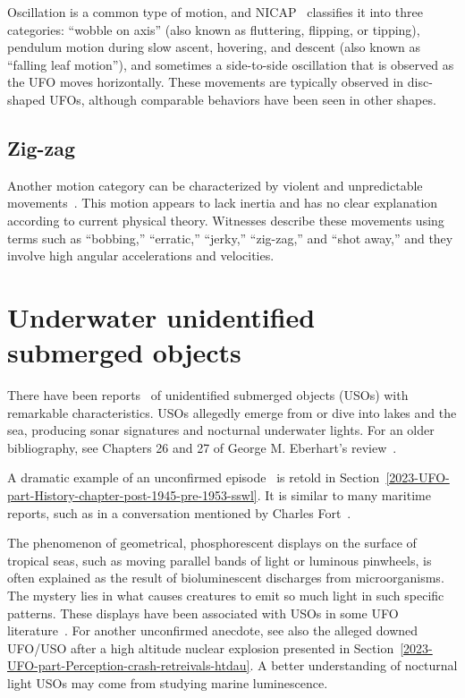 Oscillation is a common type of motion, and NICAP~\cite[p.~26]{Kocher-RAND-1968Jan} classifies it into three categories: ``wobble on axis'' (also known as fluttering, flipping, or tipping), pendulum motion during slow ascent, hovering, and descent (also known as ``falling leaf motion''), and sometimes a side-to-side oscillation that is observed as the UFO moves horizontally. These movements are typically observed in disc-shaped UFOs, although comparable behaviors have been seen in other shapes.

\subsection{Zig-zag}

Another motion category can be characterized by violent and unpredictable movements~\cite[p.~26]{Kocher-RAND-1968Jan}. This motion appears to lack inertia and has no clear explanation according to current physical theory. Witnesses describe these movements using terms such as ``bobbing,'' ``erratic,'' ``jerky,'' ``zig-zag,'' and ``shot away,'' and they involve high angular accelerations and velocities.

\section{Underwater unidentified submerged objects}

There have been reports~\cite{Sanderson-invisibeRes,DolanDisclosure2023Mar} of unidentified submerged objects (USOs) with remarkable characteristics. USOs allegedly emerge from or dive into lakes and the sea, producing sonar signatures and nocturnal underwater lights. For an older bibliography, see Chapters 26 and 27 of George M. Eberhart's review~\cite{Eberhart-I-1986Jan}.

A dramatic example of an unconfirmed episode~\cite{Brodler1952} is retold in Section~\ref{2023-UFO-part-History-chapter-post-1945-pre-1953-sswl}. It is similar to many maritime reports, such as in a conversation mentioned by Charles Fort~\cite[Chapter~21]{FortBotD}.

The phenomenon of geometrical, phosphorescent displays on the surface of tropical seas, such as moving parallel bands of light or luminous pinwheels, is often explained as the result of bioluminescent discharges from microorganisms. The mystery lies in what causes creatures to emit so much light in such specific patterns. These displays have been associated with USOs in some UFO literature~\cite[Chapter27]{Eberhart-I-1986Jan}. For another unconfirmed anecdote, see also the alleged downed UFO/USO after a high altitude nuclear explosion presented in Section~\ref{2023-UFO-part-Perception-crash-retreivals-htdau}. A better understanding of nocturnal light USOs may come from studying marine luminescence.

